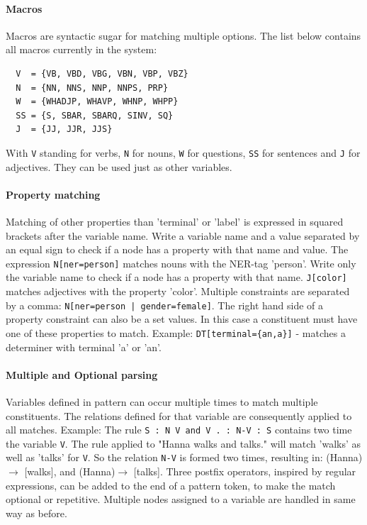 \documentclass[english]{article}
\begin{document}
\paragraph{Macros}{
  Macros are syntactic sugar for matching multiple options.  The list below contains all macros currently in the system:

  \begin{lstlisting}
  V  = {VB, VBD, VBG, VBN, VBP, VBZ}
  N  = {NN, NNS, NNP, NNPS, PRP}
  W  = {WHADJP, WHAVP, WHNP, WHPP}
  SS = {S, SBAR, SBARQ, SINV, SQ}
  J  = {JJ, JJR, JJS}
  \end{lstlisting}

  With \lstinline{V} standing for verbs, \lstinline{N} for nouns, \lstinline{W} for questions, \lstinline{SS} for sentences and \lstinline{J} for adjectives. They can be used just as other variables. 
}

\paragraph{Property matching}
Matching of other properties than 'terminal' or 'label' is expressed in squared brackets after the variable name. Write a variable name and a value separated by an equal sign to check if a node has a property with that name and value. The expression \lstinline{N[ner=person]} matches nouns with the NER-tag 'person'. Write only the variable name to check if a node has a property with that name. \lstinline{J[color]} matches adjectives with the property 'color'. Multiple constraints are separated by a comma: \lstinline{N[ner=person | gender=female]}.
The right hand side of a property constraint can also be a set values. In this case a constituent must have one of these properties to match. Example: \lstinline|DT[terminal={an,a}]| - matches a determiner with terminal 'a' or 'an'.

\paragraph{Multiple and Optional parsing}
\label{para:multi}
Variables defined in pattern can occur multiple times to match multiple constituents. The relations defined for that variable are consequently applied to all matches. Example: The rule \lstinline{S : N V and V . : N-V : S} 
contains two time the variable \lstinline{V}. The rule applied to "Hanna walks and talks." will match 'walks' as well as 'talks' for \lstinline{V}. So the relation \lstinline{N-V} is formed two times, resulting in: (Hanna)$\rightarrow$ [walks], and (Hanna)$\rightarrow$ [talks].
Three postfix operators, inspired by regular expressions, can be added to the end of a pattern token, to make the match optional or repetitive. Multiple nodes assigned to a variable are handled in same way as before.
\end{document}
